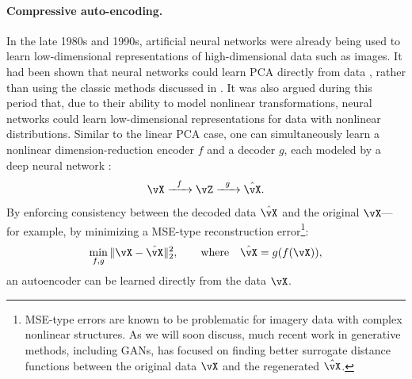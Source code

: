 \documentclass[../../book-main.tex]{subfiles}
\begin{document}
\paragraph{Compressive auto-encoding.}
In the late 1980s and 1990s, artificial neural networks were already
being used to learn low-dimensional representations of
high-dimensional data such as images. It had been shown that neural
networks could learn PCA directly from data
\cite{Oja1982SimplifiedNM,Baldi89}, rather than using the classic
methods discussed in . It was also argued during
this period that, due to their ability to model nonlinear
transformations, neural networks could learn low-dimensional
representations for data with nonlinear distributions. Similar to the
linear PCA case, one can simultaneously learn a nonlinear
dimension-reduction encoder \(f\) and a decoder \(g\), each modeled
by a deep neural network \cite{Rumelhart1986,Kramer1991NonlinearPC}:
\begin{equation}
    \vX   \xrightarrow{\hspace{2mm} f \hspace{2mm}} \vZ
    \xrightarrow{\hspace{2mm} g \hspace{2mm}} \hat{\vX}.
    \label{eqn:auto-encoding-deep-networks}
\end{equation}
By enforcing consistency between the decoded data \(\hat{\vX}\) and
the original \(\vX\)---for example, by minimizing a MSE-type
reconstruction error\footnote{MSE-type errors are known to be
    problematic for imagery data with complex nonlinear structures. As we
    will soon discuss, much recent work in generative methods, including
    GANs, has focused on finding better surrogate distance functions
between the original data \(\vX\) and the regenerated \(\hat{\vX}\).}:
\begin{equation}
    \min_{f,g} \|\vX - \hat{\vX}\|_{2}^{2}, \qquad \text{where} \quad
    \hat{\vX} = g(f(\vX)),
\end{equation}
an autoencoder can be learned directly from the data \(\vX\).
\end{document}
